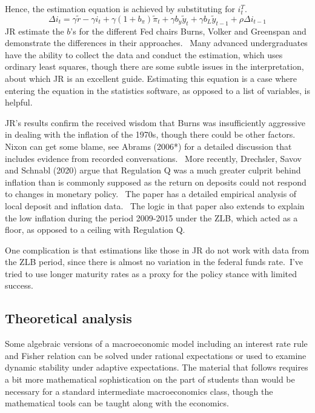 \documentclass{article}
\begin{document}
\begin{doublespace}
Hence, the estimation equation is achieved by substituting for $i_{t}^{T}$.%
\begin{equation}
\Delta i_{t}=\gamma \widetilde{r}-\gamma i_{t}+\gamma \left( 1+b_{\pi
}\right) \widetilde{\pi }_{t}+\gamma b_{y}\widetilde{y}_{t}+\gamma b_{L}%
\widetilde{y}_{t-1}+\rho \Delta i_{t-1}  \label{JR}
\end{equation}%
JR estimate the $b$'s for the different Fed chairs Burns, Volker and
Greenspan and demonstrate the differences in their approaches. \ Many
advanced undergraduates have the ability to collect the data and conduct the
estimation, which uses ordinary least squares, though there are some subtle
issues in the interpretation, about which JR is an excellent guide.
Estimating this equation is a case where entering the equation in the
statistics software, as opposed to a list of variables, is helpful.

JR's results confirm the received wisdom that Burns was insufficiently
aggressive in dealing with the inflation of the 1970s, though there could be
other factors. Nixon can get some blame, see Abrams (2006*) for a detailed
discussion that includes evidence from recorded conversations. \ More
recently, Drechsler, Savov and Schnabl (2020) argue that Regulation Q was a
much greater culprit behind inflation than is commonly supposed as the
return on deposits could not respond to changes in monetary policy. \ The
paper has a detailed empirical analysis of local deposit and inflation data.
\ The logic in that paper also extends to explain the low inflation during
the period 2009-2015 under the ZLB, which acted as a floor, as opposed to a
ceiling with Regulation Q.

One complication is that estimations like those in JR do not work with data
from the ZLB period, since there is almost no variation in the federal funds
rate.\ I've tried to use longer maturity rates as a proxy for the policy
stance with limited success.

\subsection{Theoretical analysis}

Some algebraic versions of a macroeconomic model including an interest rate
rule and Fisher relation can be solved under rational expectations or used
to examine dynamic stability under adaptive expectations. The material that
follows requires a bit more mathematical sophistication on the part of
students than would be necessary for a standard intermediate macroeconomics
class, though the mathematical tools can be taught along with the economics.


\end{doublespace}
\end{document}
